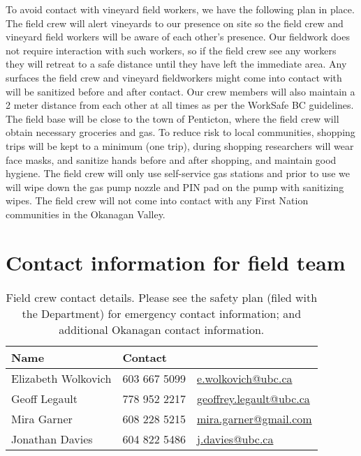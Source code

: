 \documentclass[11pt,letter]{article}
\begin{document}
To avoid contact with vineyard field workers, we have the following plan in place. The field crew will alert vineyards to our presence on site so the field crew and vineyard field workers will be aware of each other's presence. Our fieldwork does not require interaction with such workers, so if the field crew see any workers they will retreat to a safe distance until they have left the immediate area. Any surfaces the field crew and vineyard fieldworkers might come into contact with will be sanitized before and after contact. Our crew members will also maintain a 2 meter distance from each other at all times as per the WorkSafe BC guidelines. \\

The field base will be close to the town of Penticton, where the field crew will obtain necessary groceries and gas. To reduce risk to local communities, shopping trips will be kept to a minimum (one trip), during shopping researchers will wear face masks, and sanitize hands before and after shopping, and maintain good hygiene. The field crew will only use self-service gas stations and prior to use we will wipe down the gas pump nozzle and PIN pad on the pump with sanitizing wipes. The field crew will not come into contact with any First Nation communities in the Okanagan Valley.\\ 

\clearpage

\section{Contact information for field team}


\begin{table}[h!]
\caption{Field crew contact details. Please see the safety plan (filed with the Department) for emergency contact information; and additional Okanagan contact information. } %
\begin{tabular}{ l | l | l }  %
\hline\hline %
Name & Contact\\ [0.5ex] %
\hline %
Elizabeth Wolkovich & 603 667 5099 & \url{e.wolkovich@ubc.ca}  \\ %
Geoff Legault & 778 952 2217 &\url{geoffrey.legault@ubc.ca}\\
Mira Garner & 608 228 5215 & \url{mira.garner@gmail.com}\\
Jonathan Davies & 604 822 5486 & \url{j.davies@ubc.ca} \\ 
\hline %
\end{tabular}
\label{table:nonlin} %
\end{table}
\end{document}
